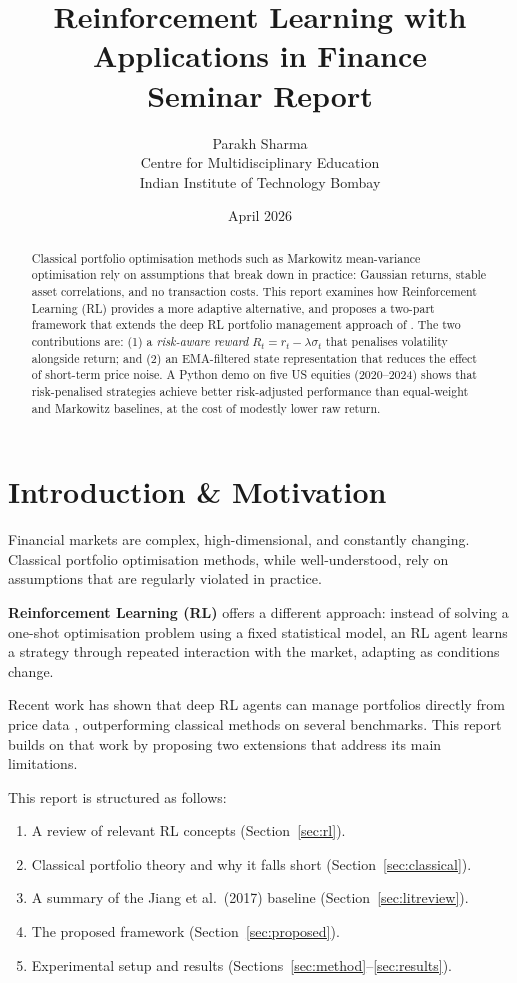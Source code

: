 \documentclass[12pt,a4paper]{article}
\title{%
  \textbf{Reinforcement Learning with Applications in Finance}\\[4pt]
  \large Seminar Report
}
\author{Parakh Sharma\\
  \small Centre for Multidisciplinary Education\\
  \small Indian Institute of Technology Bombay
}
\date{April 2026}
\begin{document}
\maketitle

\begin{abstract}
Classical portfolio optimisation methods such as Markowitz mean-variance
optimisation rely on assumptions that break down in practice: Gaussian
returns, stable asset correlations, and no transaction costs.
This report examines how Reinforcement Learning (RL) provides a more
adaptive alternative, and proposes a two-part framework that extends
the deep RL portfolio management approach of \citet{jiang2017deep}.
The two contributions are:
(1) a \emph{risk-aware reward} $R_t = r_t - \lambda\sigma_t$ that
penalises volatility alongside return; and
(2) an EMA-filtered state representation that reduces the effect of
short-term price noise.
A Python demo on five US equities (2020--2024) shows that risk-penalised
strategies achieve better risk-adjusted performance than equal-weight and
Markowitz baselines, at the cost of modestly lower raw return.
\end{abstract}

\newpage
\tableofcontents
\newpage

\section{Introduction \& Motivation}

Financial markets are complex, high-dimensional, and constantly changing.
Classical portfolio optimisation methods, while well-understood, rely on
assumptions that are regularly violated in practice.

\textbf{Reinforcement Learning (RL)} offers a different approach: instead
of solving a one-shot optimisation problem using a fixed statistical model,
an RL agent learns a strategy through repeated interaction with the
market, adapting as conditions change.

Recent work has shown that deep RL agents can manage portfolios directly
from price data \citep{jiang2017deep}, outperforming classical methods on
several benchmarks. This report builds on that work by proposing two
extensions that address its main limitations.

This report is structured as follows:
\begin{enumerate}[nosep]
  \item A review of relevant RL concepts (Section~\ref{sec:rl}).
  \item Classical portfolio theory and why it falls short
        (Section~\ref{sec:classical}).
  \item A summary of the Jiang et al.\ (2017) baseline
        (Section~\ref{sec:litreview}).
  \item The proposed framework (Section~\ref{sec:proposed}).
  \item Experimental setup and results
        (Sections~\ref{sec:method}--\ref{sec:results}).
\end{enumerate}
\end{document}
